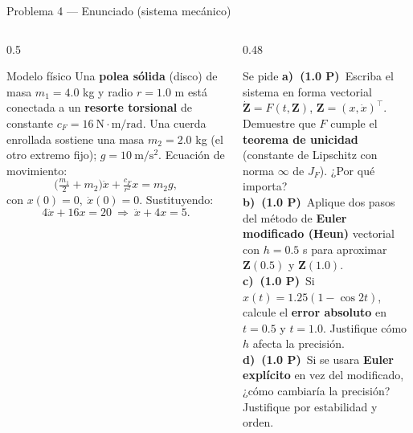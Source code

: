\documentclass[aspectratio=169,10pt]{beamer}
\begin{document}
\begin{frame}{Problema 4 — Enunciado (sistema mecánico)}
\begin{columns}[T]
\begin{column}{0.5\textwidth}
\begin{cardidea}{Modelo físico}{\faCogs}
{\footnotesize Una \textbf{polea sólida} (disco) de masa $m_1=4.0$ kg y radio $r=1.0$ m está conectada a un \textbf{resorte torsional} de constante $c_F=16\ \mathrm{N\cdot m/rad}$. Una cuerda enrollada sostiene una masa $m_2=2.0$ kg (el otro extremo fijo); $g=10\ \mathrm{m/s^2}$. Ecuación de movimiento:
\[
\Big(\tfrac{m_1}{2}+m_2\Big)\ddot x+\tfrac{c_F}{r^{2}}x=m_2 g,
\]
con $x(0)=0,\ \dot x(0)=0$. Sustituyendo:
\[
4\ddot x+16x=20\ \Rightarrow\ \ddot x+4x=5.
\]}
\end{cardidea}
\end{column}
\begin{column}{0.48\textwidth}
\begin{cardidea}{Se pide}{\faTasks}
{\scriptsize
\textbf{a)\ (1.0 P)}\ Escriba el sistema en forma vectorial $\dot{\mathbf Z}=F(t,\mathbf Z)$, $\mathbf Z=(x,\dot x)^{\!\top}$. Demuestre que $F$ cumple el \textbf{teorema de unicidad} (constante de Lipschitz con norma $\infty$ de $J_F$). ¿Por qué importa?\\[0.8mm]
\textbf{b)\ (1.0 P)}\ Aplique dos pasos del método de \textbf{Euler modificado (Heun)} vectorial con $h=0.5$ s para aproximar $\mathbf Z(0.5)$ y $\mathbf Z(1.0)$.\\[0.8mm]
\textbf{c)\ (1.0 P)}\ Si $x(t)=1.25(1-\cos 2t)$, calcule el \textbf{error absoluto} en $t=0.5$ y $t=1.0$. Justifique cómo $h$ afecta la precisión.\\[0.8mm]
\textbf{d)\ (1.0 P)}\ Si se usara \textbf{Euler explícito} en vez del modificado, ¿cómo cambiaría la precisión? Justifique por estabilidad y orden.}
\end{cardidea}
\end{column}
\end{columns}
\end{frame}
\end{document}
